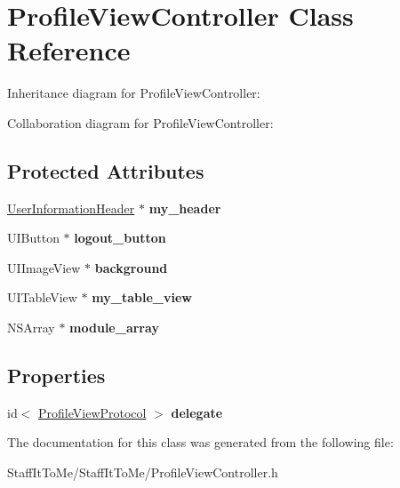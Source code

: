 \hypertarget{interface_profile_view_controller}{
\section{\-Profile\-View\-Controller \-Class \-Reference}
\label{interface_profile_view_controller}
}


\-Inheritance diagram for \-Profile\-View\-Controller\-:


\-Collaboration diagram for \-Profile\-View\-Controller\-:
\subsection*{\-Protected \-Attributes}
\begin{DoxyCompactItemize}
\item 
\hypertarget{interface_profile_view_controller_adfe70abfcad8fa73b3723bd910949daa}{
\hyperlink{interface_user_information_header}{\-User\-Information\-Header} $\ast$ {\bfseries my\-\_\-header}}
\label{interface_profile_view_controller_adfe70abfcad8fa73b3723bd910949daa}

\item 
\hypertarget{interface_profile_view_controller_a4fe0629c6c4d750ff3fa3bdd111ef6bc}{
\-U\-I\-Button $\ast$ {\bfseries logout\-\_\-button}}
\label{interface_profile_view_controller_a4fe0629c6c4d750ff3fa3bdd111ef6bc}

\item 
\hypertarget{interface_profile_view_controller_a62adc48f2d2ae06432de8c5cbeafbcb2}{
\-U\-I\-Image\-View $\ast$ {\bfseries background}}
\label{interface_profile_view_controller_a62adc48f2d2ae06432de8c5cbeafbcb2}

\item 
\hypertarget{interface_profile_view_controller_a5f354f8d4a919ac48db2bd8e6b889658}{
\-U\-I\-Table\-View $\ast$ {\bfseries my\-\_\-table\-\_\-view}}
\label{interface_profile_view_controller_a5f354f8d4a919ac48db2bd8e6b889658}

\item 
\hypertarget{interface_profile_view_controller_a263a9d617b3c555754495f1956da2797}{
\-N\-S\-Array $\ast$ {\bfseries module\-\_\-array}}
\label{interface_profile_view_controller_a263a9d617b3c555754495f1956da2797}

\end{DoxyCompactItemize}
\subsection*{\-Properties}
\begin{DoxyCompactItemize}
\item 
\hypertarget{interface_profile_view_controller_a66d233bf929854d90d28cfcd4c0e1859}{
id$<$ \hyperlink{protocol_profile_view_protocol-p}{\-Profile\-View\-Protocol} $>$ {\bfseries delegate}}
\label{interface_profile_view_controller_a66d233bf929854d90d28cfcd4c0e1859}

\end{DoxyCompactItemize}


\-The documentation for this class was generated from the following file\-:\begin{DoxyCompactItemize}
\item 
\-Staff\-It\-To\-Me/\-Staff\-It\-To\-Me/\-Profile\-View\-Controller.\-h\end{DoxyCompactItemize}
